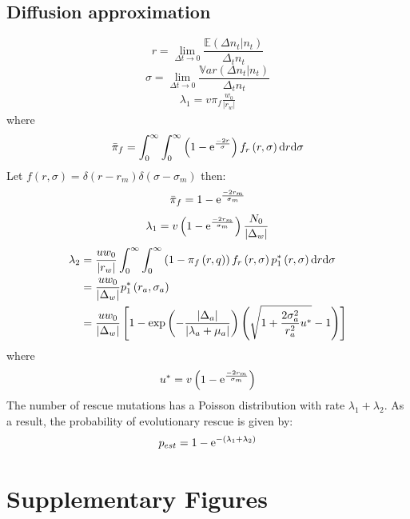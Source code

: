 \documentclass[12pt]{extarticle}
\renewcommand{\d}{{\rm d}}
\newcommand{\e}{{\rm e}}
\newcommand{\beginsupplement}{%
      	\setcounter{table}{0}
        \renewcommand{\thetable}{S\arabic{table}}%
        \setcounter{figure}{0}
        \renewcommand{\thefigure}{S\arabic{figure}}%
		\setcounter{equation}{0}
        \renewcommand{\theequation}{A\arabic{equation}}%
}
\begin{document}
\begin{appendices}
\section*{Diffusion approximation}\label{AppendixDiffApprox}
\begin{equation}
r=\lim_{\Delta t\rightarrow0}\frac{\mathbb{E}\left(\Delta n_t|n_t\right)}{\Delta_t n_t}
\end{equation}
\begin{equation}
\sigma=\lim_{\Delta t\rightarrow0}\frac{\mathbb{V}ar\left(\Delta n_t|n_t\right)}{\Delta_t n_t}
\end{equation}
\begin{align}
\lambda_1=v\pi_f\frac{w_0}{|r_w|}
\end{align}
where
\begin{align}
\bar{\pi}_f=\int_{0}^\infty\int_{0}^\infty \left(1-\e^{\frac{-2r}{\sigma}}\right) f_r\left(r,\sigma\right)\d r\d\sigma
\end{align}
Let $f\left(r,\sigma\right)=\delta\left(r-r_m\right)\delta\left(\sigma-\sigma_m\right)$ then:
\begin{align}
\bar{\pi}_f=1-\e^{\frac{-2r_m}{\sigma_m}}
\end{align}
\begin{align}
\lambda_1=v\left(1-\e^{\frac{-2r_m}{\sigma_m}}\right)\frac{N_0}{|\Delta_w|}
\end{align}
\begin{align}
\lambda_2&=\frac{uw_0}{|r_w|}\int_{0}^\infty\int_{0}^\infty \left(1-\pi_f\left(r,q\right)\right) f_r\left(r,\sigma\right) p_1^*\left(r,\sigma\right)\d r\d\sigma\\
&=\frac{uw_0}{|\Delta_w|}p_1^*\left(r_a,\sigma_a\right)\\
&=\frac{uw_0}{|\Delta_w|}\left[1-\exp\left(-\frac{|\Delta_a|}{|\lambda_a+\mu_a|}\right)\left(\sqrt{1+\frac{2\sigma_a^2}{r_a^2}u^*}-1\right)\right]
\end{align}
where
\begin{equation}
u^*=v\left(1-\e^{\frac{-2r_m}{\sigma_m}}\right)
\end{equation}
The number of rescue mutations has a Poisson distribution with rate $\lambda_1+\lambda_2$. As a result, the probability of evolutionary rescue is given by:
\begin{equation}
p_{est}=1-\e^{-\left(\lambda_1+\lambda_2\right)}
\end{equation}

\end{appendices}

\newpage
\section*{Supplementary Figures}
\beginsupplement %

\end{document}
